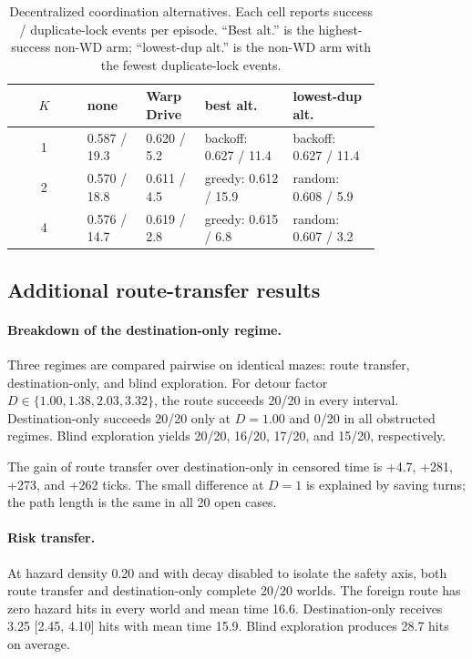 \documentclass{article}
\begin{document}
\begin{table}[h]
\caption{Decentralized coordination alternatives. Each cell reports success / duplicate-lock events per episode. ``Best alt.'' is the highest-success non-WD arm; ``lowest-dup alt.'' is the non-WD arm with the fewest duplicate-lock events.}
\label{tab:coord-baselines}
\centering
\scriptsize
\begin{tabular}{c L{0.16\linewidth} L{0.16\linewidth} L{0.24\linewidth} L{0.24\linewidth}}
\toprule
$K$ & none & Warp Drive & best alt. & lowest-dup alt. \\
 & 0.587 / 19.3 & 0.620 / 5.2 & backoff: 0.627 / 11.4 & backoff: 0.627 / 11.4 \\
2 & 0.570 / 18.8 & 0.611 / 4.5 & greedy: 0.612 / 15.9 & random: 0.608 / 5.9 \\
4 & 0.576 / 14.7 & 0.619 / 2.8 & greedy: 0.615 / 6.8 & random: 0.607 / 3.2 \\
\bottomrule
\end{tabular}
\end{table}

\subsection{Additional route-transfer results}

\paragraph{Breakdown of the destination-only regime.}
Three regimes are compared pairwise on identical mazes: route transfer, destination-only, and blind exploration. For detour factor $D\in\{1.00,1.38,2.03,3.32\}$, the route succeeds 20/20 in every interval. Destination-only succeeds 20/20 only at $D=1.00$ and 0/20 in all obstructed regimes. Blind exploration yields 20/20, 16/20, 17/20, and 15/20, respectively.

The gain of route transfer over destination-only in censored time is +4.7, +281, +273, and +262 ticks. The small difference at $D=1$ is explained by saving turns; the path length is the same in all 20 open cases.

\paragraph{Risk transfer.}
At hazard density 0.20 and with decay disabled to isolate the safety axis, both route transfer and destination-only complete 20/20 worlds. The foreign route has zero hazard hits in every world and mean time 16.6. Destination-only receives 3.25 [2.45, 4.10] hits with mean time 15.9. Blind exploration produces 28.7 hits on average.
\end{document}
